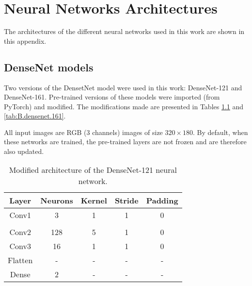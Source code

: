 \chapter{Neural Networks Architectures}\label{ch:neural.networks.architectures}

The architectures of the different neural networks used in this work are shown in this appendix.

\section{DenseNet models}

Two versions of the DensetNet model \cite{huang2017densely} were used in this work: DenseNet-121 and DenseNet-161. Pre-trained versions of these models were imported (from PyTorch) and modified. The modifications made are presented in Tables \ref{tab:B.densenet.121} and \ref{tab:B.densenet.161}.

All input images are RGB (3 channels) images of size $320 \times 180$. By default, when these networks are trained, the pre-trained layers are not frozen and are therefore also updated.

\begin{table}[H]
    \centering
    \begin{tabular}{|c|c|c|c|c|}
        \hline
        \textbf{Layer} & \textbf{Neurons} & \textbf{Kernel} & \textbf{Stride} & \textbf{Padding} \\ \hline
        \hline
        Conv1 & 3 & 1 & 1 & 0 \\ \hline
        \rowcolor{LightGray}
        \multicolumn{5}{|c|}{Usual DenseNet-121 architecture \cite{huang2017densely}} \\ \hline
        Conv2 & 128 & 5 & 1 & 0 \\ \hline
        Conv3 & 16 & 1 & 1 & 0 \\ \hline
        Flatten & - & - & - & - \\ \hline
        Dense & 2 & - & - & - \\ \hline
    \end{tabular}
    \caption{Modified architecture of the DenseNet-121 neural network.}
    \label{tab:B.densenet.121}
\end{table}

